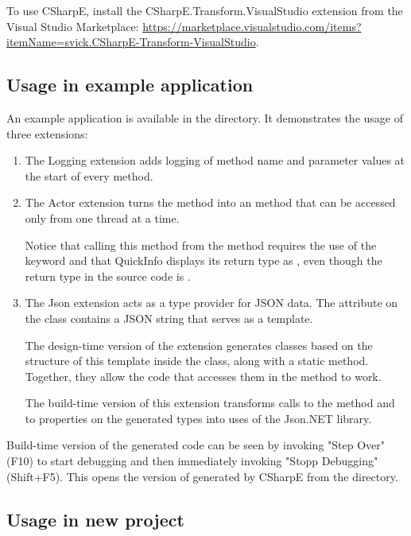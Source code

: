 To use CSharpE, install the CSharpE.Transform.VisualStudio extension from the Visual Studio Marketplace: \url{https://marketplace.visualstudio.com/items?itemName=svick.CSharpE-Transform-VisualStudio}.

\subsection{Usage in example application}

An example application is available in the  directory. It demonstrates the usage of three extensions:

\begin{enumerate}
\item The Logging extension adds logging of method name and parameter values at the start of every method.

\item The Actor extension turns the method  into an  method that can be accessed only from one thread at a time.

Notice that calling this method from the  method requires the use of the  keyword and that QuickInfo displays its return type as , even though the return type in the source code is .

\item The Json extension acts as a type provider for JSON data. The attribute on the   class contains a JSON string that serves as a template.

The design-time version of the extension generates classes based on the structure of this template inside the  class, along with a static  method. Together, they allow the code that accesses them in the method  to work.

The build-time version of this extension transforms calls to the  method and to properties on the generated types into uses of the Json.NET library.
\end{enumerate}


Build-time version of the generated code can be seen by invoking "Step Over" (F10) to start debugging and then immediately invoking "Stopp Debugging" (Shift+F5). This opens the version of  generated by CSharpE from the  directory.


\subsection{Usage in new project}